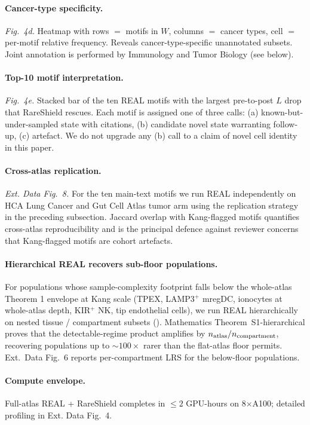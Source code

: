 \paragraph{Cancer-type specificity.} \emph{Fig.~4d.}  Heatmap with rows $=$ motifs in $W$, columns $=$ cancer types, cell $=$ per-motif relative frequency.  Reveals cancer-type-specific unannotated subsets.  Joint annotation is performed by Immunology and Tumor Biology (see below).

\paragraph{Top-10 motif interpretation.} \emph{Fig.~4e.}  Stacked bar of the ten REAL motifs with the largest pre-to-post $L$ drop that RareShield rescues.  Each motif is assigned one of three calls: (a) known-but-under-sampled state with citations, (b) candidate novel state warranting follow-up, (c) artefact.  We do not upgrade any (b) call to a claim of novel cell identity in this paper.



\paragraph{Cross-atlas replication.} \emph{Ext. Data Fig.~8.}  For the ten main-text motifs we run REAL independently on HCA Lung Cancer and Gut Cell Atlas tumor arm using the replication strategy in the preceding subsection.  Jaccard overlap with Kang-flagged motifs quantifies cross-atlas reproducibility and is the principal defence against reviewer concerns that Kang-flagged motifs are cohort artefacts.

\paragraph{Hierarchical REAL recovers sub-floor populations.} For populations whose sample-complexity footprint falls below the whole-atlas Theorem 1 envelope at Kang scale (TPEX, LAMP3$^+$ mregDC, ionocytes at whole-atlas depth, KIR$^+$ NK, tip endothelial cells), we run REAL hierarchically on nested tissue / compartment subsets (). Mathematics Theorem~S1-hierarchical proves that the detectable-regime product amplifies by $n_{\rm atlas}/n_{\rm compartment}$, recovering populations up to $\sim 100\times$ rarer than the flat-atlas floor permits. Ext.~Data Fig.~6 reports per-compartment LRS for the below-floor populations.

\paragraph{Compute envelope.} Full-atlas REAL + RareShield completes in $\le 2$ GPU-hours on 8$\times$A100; detailed profiling in Ext. Data Fig.~4.
